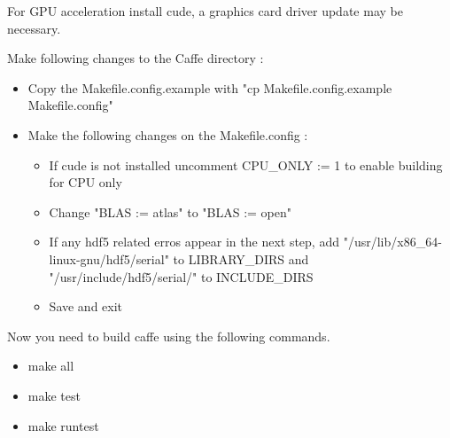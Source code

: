 \documentclass[main.tex]{subfiles}
\begin{document}
 For GPU acceleration install cude, a graphics card driver update may be necessary.
 
 Make following changes to the Caffe directory : 
 \begin{itemize}
 \item Copy the Makefile.config.example with "cp Makefile.config.example Makefile.config"
 \item Make the following changes on the Makefile.config :
 	\begin{itemize}
 	\item If cude is not installed uncomment CPU\_ONLY := 1 to enable building for CPU only
 	\item Change "BLAS := atlas" to "BLAS := open"
 	\item If any hdf5 related erros appear in the next step, add "/usr/lib/x86\_64-linux-gnu/hdf5/serial" to LIBRARY\_DIRS and "/usr/include/hdf5/serial/" to INCLUDE\_DIRS
 	\item Save and exit
 	\end{itemize}
 	
 \end{itemize}
Now you need to build caffe using the following commands.
\begin{itemize}
\item make all
\item make test
\item make runtest  
 \end{itemize}

 
\end{document}
